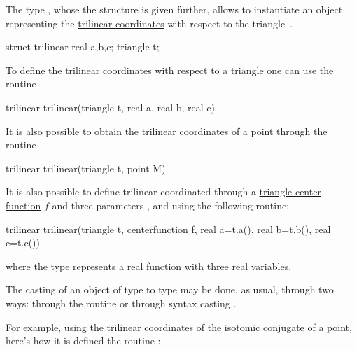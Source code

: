 \documentclass[pdftex]{article}
\begin{document}
The type , whose the structure is given further,
allows to instantiate an object representing the
\href{http://mathworld.wolfram.com/TrilinearCoordinates.html}{trilinear
  coordinates}  with respect to the triangle~.
\begin{center}
  \begin{Vcolor}
    struct trilinear
    {
      real a,b,c;
      triangle t;
    }
  \end{Vcolor}
\end{center}
To define the trilinear coordinates  with respect to a
triangle  one can use the routine

\begin{Vcolor}
  trilinear trilinear(triangle t, real a, real b, real c)
\end{Vcolor}

It is also possible to obtain the trilinear coordinates of a point
through the routine

\begin{Vcolor}
  trilinear trilinear(triangle t, point M)
\end{Vcolor}

It is also possible to define trilinear coordinated through a
\href{http://mathworld.wolfram.com/TriangleCenterFunction.html}{triangle
  center function} $f$ and three parameters , 
and  using the following
routine:

\begin{Vcolor}
  trilinear trilinear(triangle t, centerfunction f,
  real a=t.a(), real b=t.b(), real c=t.c())
\end{Vcolor}

\noindent where the type  represents a real
function with three real variables.

The casting of an object of type  to type 
may be done, as usual, through two ways: through the routine
 or through syntax casting .

For example, using the
\href{http://mathworld.wolfram.com/IsotomicConjugate.html}{trilinear
  coordinates of the isotomic conjugate} of a point, here's how it is
defined the routine :
\end{document}
